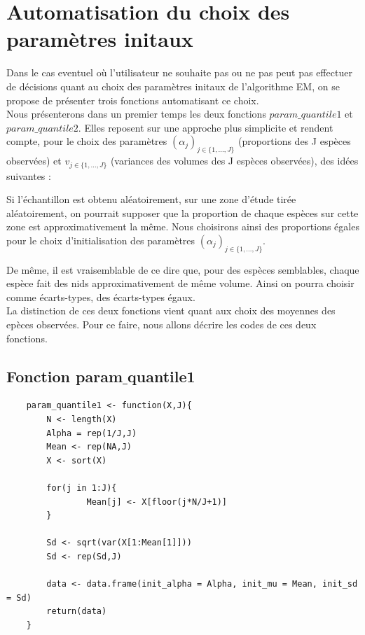 \documentclass[frenchb]{report}
\newcommand{\1}{\mathbbm{1}}
\theoremstyle{definition}\newtheorem{defn}{Définition}
\theoremstyle{definition}\newtheorem{exm}{Exemple}
\theoremstyle{definition}\newtheorem{nota}{Notation}
\theoremstyle{definition}\newtheorem{rem}{Remarque}
\begin{document}
\section{Automatisation du choix des paramètres initaux}

Dans le cas eventuel où l'utilisateur ne souhaite pas ou ne pas peut pas effectuer de décisions quant au choix des paramètres initaux de l'algorithme EM, on se propose de présenter trois fonctions automatisant ce choix. \\

Nous présenterons dans un premier temps les deux fonctions $param\_quantile1$ et $param\_quantile2$. Elles reposent sur une approche plus simplicite et rendent compte, pour le choix des paramètres $(\alpha_j)_{j \in \{1,...,J\}}$ (proportions des J espèces observées) et $v_{j \in \{1,...,J\}}$ (variances des volumes des J espèces observées), des idées suivantes : 

Si l'échantillon est obtenu aléatoirement, sur une zone d'étude tirée aléatoirement, on pourrait supposer que la proportion de chaque espèces sur cette zone est approximativement la même. 
Nous choisirons ainsi des proportions égales pour le choix d'initialisation des paramètres  $(\alpha_j)_{j \in \{1,...,J\}}$.

De même, il est vraisemblable de ce dire que, pour des espèces semblables, chaque espèce fait des nids approximativement de même volume. Ainsi on pourra choisir comme écarts-types, des écarts-types égaux.\\

La distinction de ces deux fonctions vient quant aux choix des moyennes des epèces observées.
Pour ce faire, nous allons décrire les codes de ces deux fonctions.


\subsection{Fonction param$\_$quantile1}

\begin{lstlisting}
	param_quantile1 <- function(X,J){
  		N <- length(X)
  		Alpha = rep(1/J,J)
  		Mean <- rep(NA,J)
  		X <- sort(X)
  
  		for(j in 1:J){
    			Mean[j] <- X[floor(j*N/J+1)]
  		}
  
  		Sd <- sqrt(var(X[1:Mean[1]]))
  		Sd <- rep(Sd,J)
  
  		data <- data.frame(init_alpha = Alpha, init_mu = Mean, init_sd = Sd)
  		return(data)
	}
\end{lstlisting}
\end{document}
